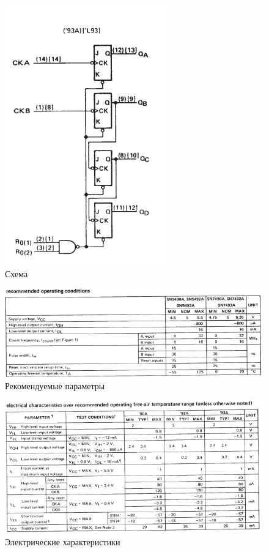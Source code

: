 \begin{figure}[H]
	\centering
	\includegraphics[width=0.55\linewidth]{imgs/12/12_sh}
	\caption{Схема}
	\label{fig:11_sh}
\end{figure}

\begin{figure}[H]
	\centering
	\includegraphics[width=0.8\linewidth]{imgs/12/12_rec}
	\caption{Рекомендуемые параметры}
	\label{fig:12_rec}
\end{figure}

\begin{figure}[H]
	\centering
	\includegraphics[width=0.95\linewidth]{imgs/12/12_ch}
	\caption{Электрические характеристики}
	\label{fig:12_ch}
\end{figure}

